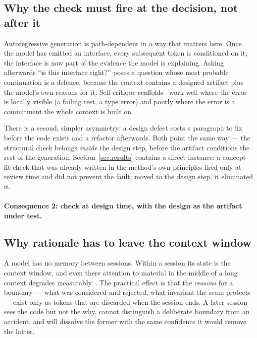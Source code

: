 \documentclass[11pt]{article}
\begin{document}
\subsection{Why the check must fire at the decision, not after it}

Autoregressive generation is path-dependent in a way that matters here. Once the model has emitted an interface, every subsequent token is conditioned on it; the interface is now part of the evidence the model is explaining. Asking afterwards ``is this interface right?'' poses a question whose most probable continuation is a defence, because the context contains a designed artifact plus the model's own reasons for it. Self-critique scaffolds~\cite{madaan2023selfrefine,shinn2023reflexion} work well where the error is locally visible (a failing test, a type error) and poorly where the error is a commitment the whole context is built on.

There is a second, simpler asymmetry: a design defect costs a paragraph to fix before the code exists and a refactor afterwards. Both point the same way --- the structural check belongs \emph{inside} the design step, before the artifact conditions the rest of the generation. Section~\ref{sec:results} contains a direct instance: a concept-fit check that was already written in the method's own principles fired only at review time and did not prevent the fault; moved to the design step, it eliminated it.

\paragraph{Consequence 2: check at design time, with the design as the artifact under test.}

\subsection{Why rationale has to leave the context window}

A model has no memory between sessions. Within a session its state is the context window, and even there attention to material in the middle of a long context degrades measurably~\cite{liu2024lost}. The practical effect is that the \emph{reasons} for a boundary --- what was considered and rejected, what invariant the seam protects --- exist only as tokens that are discarded when the session ends. A later session sees the code but not the why, cannot distinguish a deliberate boundary from an accident, and will dissolve the former with the same confidence it would remove the latter.
\end{document}
